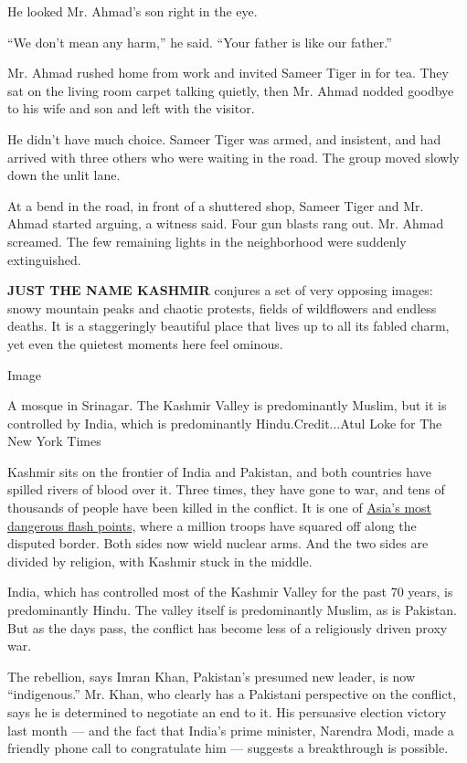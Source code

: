 He looked Mr. Ahmad's son right in the eye.

``We don't mean any harm,'' he said. ``Your father is like our father.''

Mr. Ahmad rushed home from work and invited Sameer Tiger in for tea.
They sat on the living room carpet talking quietly, then Mr. Ahmad
nodded goodbye to his wife and son and left with the visitor.

He didn't have much choice. Sameer Tiger was armed, and insistent, and
had arrived with three others who were waiting in the road. The group
moved slowly down the unlit lane.

At a bend in the road, in front of a shuttered shop, Sameer Tiger and
Mr. Ahmad started arguing, a witness said. Four gun blasts rang out. Mr.
Ahmad screamed. The few remaining lights in the neighborhood were
suddenly extinguished.

\textbf{JUST THE NAME KASHMIR} conjures a set of very opposing images:
snowy mountain peaks and chaotic protests, fields of wildflowers and
endless deaths. It is a staggeringly beautiful place that lives up to
all its fabled charm, yet even the quietest moments here feel ominous.

Image

A mosque in Srinagar. The Kashmir Valley is predominantly Muslim, but it
is controlled by India, which is predominantly Hindu.Credit...Atul Loke
for The New York Times

Kashmir sits on the frontier of India and Pakistan, and both countries
have spilled rivers of blood over it. Three times, they have gone to
war, and tens of thousands of people have been killed in the conflict.
It is one of
\href{http://www.nytimes.com/1999/08/12/world/vale-tears-special-report-kashmir-crushed-jewel-caught-vise-hatred.html}{Asia's
most dangerous flash points}, where a million troops have squared off
along the disputed border. Both sides now wield nuclear arms. And the
two sides are divided by religion, with Kashmir stuck in the middle.

India, which has controlled most of the Kashmir Valley for the past 70
years, is predominantly Hindu. The valley itself is predominantly
Muslim, as is Pakistan. But as the days pass, the conflict has become
less of a religiously driven proxy war.

The rebellion, says Imran Khan, Pakistan's presumed new leader, is now
``indigenous.'' Mr. Khan, who clearly has a Pakistani perspective on the
conflict, says he is determined to negotiate an end to it. His
persuasive election victory last month --- and the fact that India's
prime minister, Narendra Modi, made a friendly phone call to
congratulate him --- suggests a breakthrough is possible.

